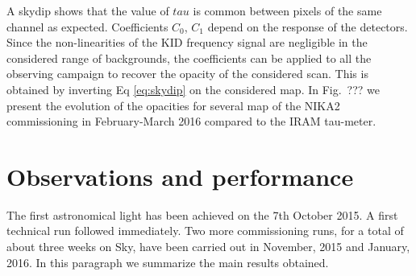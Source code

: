 \documentclass[]{aa} %
\begin{document}
A skydip shows that the value of $tau$ is common between pixels of the same channel as expected. Coefficients  $C_0$, $C_1$ depend on the response of the detectors. Since the non-linearities of the KID frequency signal are negligible in the considered range of backgrounds, the coefficients can be applied to all the observing campaign to recover the opacity of the considered scan. This is
obtained by inverting Eq \ref{eq:skydip} on the considered map. In Fig.~??? we present the evolution of the opacities for several map of the NIKA2 commissioning  in February-March 2016 compared to the IRAM tau-meter.


\section{Observations and performance}

The first astronomical light has been achieved on the 7th October 2015. A first technical run followed immediately. Two more commissioning runs, for a total of about three weeks on Sky, have been carried out in November, 2015 and January, 2016. In this paragraph we summarize the main results obtained.
\end{document}
